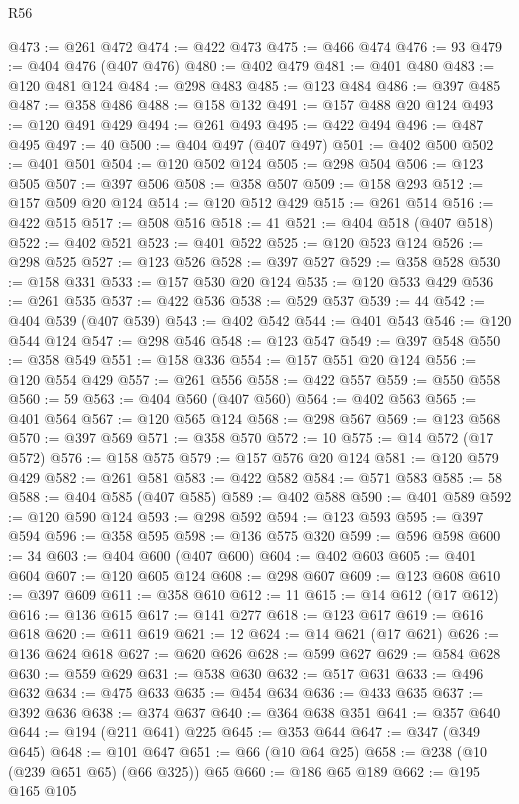 \begin{lexlean}{R56}
\begin{coremodule}
@473 := @261 @472
@474 := @422 @473
@475 := @466 @474
@476 := 93
@479 := @404 @476 (@407 @476)
@480 := @402 @479
@481 := @401 @480
@483 := @120 @481 @124
@484 := @298 @483
@485 := @123 @484
@486 := @397 @485
@487 := @358 @486
@488 := @158 @132
@491 := @157 @488 @20 @124
@493 := @120 @491 @429
@494 := @261 @493
@495 := @422 @494
@496 := @487 @495
@497 := 40
@500 := @404 @497 (@407 @497)
@501 := @402 @500
@502 := @401 @501
@504 := @120 @502 @124
@505 := @298 @504
@506 := @123 @505
@507 := @397 @506
@508 := @358 @507
@509 := @158 @293
@512 := @157 @509 @20 @124
@514 := @120 @512 @429
@515 := @261 @514
@516 := @422 @515
@517 := @508 @516
@518 := 41
@521 := @404 @518 (@407 @518)
@522 := @402 @521
@523 := @401 @522
@525 := @120 @523 @124
@526 := @298 @525
@527 := @123 @526
@528 := @397 @527
@529 := @358 @528
@530 := @158 @331
@533 := @157 @530 @20 @124
@535 := @120 @533 @429
@536 := @261 @535
@537 := @422 @536
@538 := @529 @537
@539 := 44
@542 := @404 @539 (@407 @539)
@543 := @402 @542
@544 := @401 @543
@546 := @120 @544 @124
@547 := @298 @546
@548 := @123 @547
@549 := @397 @548
@550 := @358 @549
@551 := @158 @336
@554 := @157 @551 @20 @124
@556 := @120 @554 @429
@557 := @261 @556
@558 := @422 @557
@559 := @550 @558
@560 := 59
@563 := @404 @560 (@407 @560)
@564 := @402 @563
@565 := @401 @564
@567 := @120 @565 @124
@568 := @298 @567
@569 := @123 @568
@570 := @397 @569
@571 := @358 @570
@572 := 10
@575 := @14 @572 (@17 @572)
@576 := @158 @575
@579 := @157 @576 @20 @124
@581 := @120 @579 @429
@582 := @261 @581
@583 := @422 @582
@584 := @571 @583
@585 := 58
@588 := @404 @585 (@407 @585)
@589 := @402 @588
@590 := @401 @589
@592 := @120 @590 @124
@593 := @298 @592
@594 := @123 @593
@595 := @397 @594
@596 := @358 @595
@598 := @136 @575 @320
@599 := @596 @598
@600 := 34
@603 := @404 @600 (@407 @600)
@604 := @402 @603
@605 := @401 @604
@607 := @120 @605 @124
@608 := @298 @607
@609 := @123 @608
@610 := @397 @609
@611 := @358 @610
@612 := 11
@615 := @14 @612 (@17 @612)
@616 := @136 @615
@617 := @141 @277
@618 := @123 @617
@619 := @616 @618
@620 := @611 @619
@621 := 12
@624 := @14 @621 (@17 @621)
@626 := @136 @624 @618
@627 := @620 @626
@628 := @599 @627
@629 := @584 @628
@630 := @559 @629
@631 := @538 @630
@632 := @517 @631
@633 := @496 @632
@634 := @475 @633
@635 := @454 @634
@636 := @433 @635
@637 := @392 @636
@638 := @374 @637
@640 := @364 @638 @351
@641 := @357 @640
@644 := @194 (@211 @641) @225
@645 := @353 @644
@647 := @347 (@349 @645)
@648 := @101 @647
@651 := @66 (@10 @64 @25)
@658 := @238 (@10 (@239 @651 @65) (@66 @325)) @65
@660 := @186 @65 @189
@662 := @195 @165 @105

\end{coremodule}
\end{lexlean}
